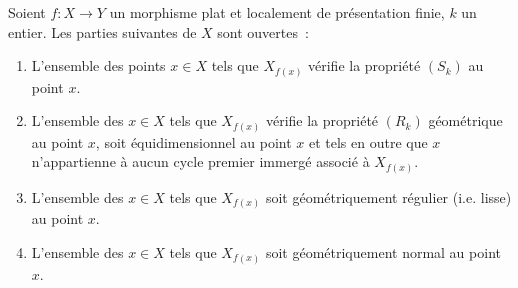 \begin{theorem}[12.1.6]
\label{IV.12.1.6-fr}
Soient $f:X\to Y$ un morphisme plat et localement de présentation finie, $k$
un entier. Les parties suivantes de $X$ sont ouvertes~:
\begin{enumerate}[label=(\roman*)]
  \item L'ensemble des points $x\in X$ tels que $X_{f(x)}$ vérifie la propriété
  $(S_k)$ au point $x$.
  \item L'ensemble des $x\in X$ tels que $X_{f(x)}$ vérifie la propriété
  $(R_k)$ géométrique au point $x$, soit équidimensionnel au point $x$ et tels
  en outre que $x$ n'appartienne à aucun cycle premier immergé associé à
  $X_{f(x)}$.
  \item L'ensemble des $x\in X$ tels que $X_{f(x)}$ soit géométriquement
  régulier (i.e. lisse) au point $x$.
  \item L'ensemble des $x\in X$ tels que $X_{f(x)}$ soit géométriquement
  normal au point $x$.
\end{enumerate}
\end{theorem}

